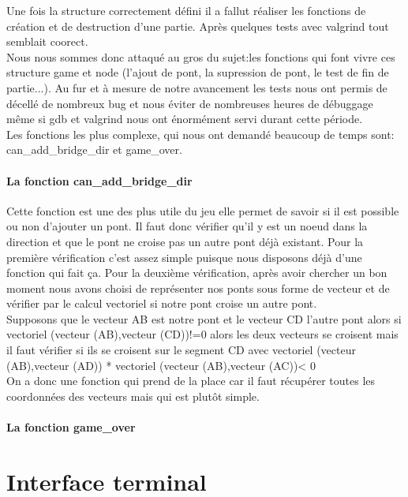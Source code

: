 \documentclass[12pt]{report}
\begin{document}
\textnormal{Une fois la structure correctement défini il a fallut réaliser les fonctions de création et de destruction d'une partie. Après quelques tests avec valgrind tout semblait coorect.\\ Nous nous sommes donc attaqué au gros du sujet:les fonctions qui font vivre ces structure game et node (l'ajout de pont, la supression de pont, le test de fin de partie...). Au fur et à mesure de notre avancement les tests nous ont permis de décellé de nombreux bug et nous éviter de nombreuses heures de débuggage même si gdb et valgrind nous ont énormément servi durant cette période.\\ Les fonctions les plus complexe, qui nous ont demandé beaucoup de temps sont: can\_add\_bridge\_dir et game\_over.}

\subsubsection{La fonction can\_add\_bridge\_dir}
\textnormal{Cette fonction est une des plus utile du jeu elle permet de savoir si il est possible ou non d'ajouter un pont. Il faut donc vérifier qu'il y est un noeud dans la direction et que le pont ne croise pas un autre pont déjà existant. Pour la première vérification c'est assez simple puisque nous disposons déjà d'une fonction qui fait ça. Pour la deuxième vérification, après avoir chercher un bon moment nous avons choisi de représenter nos ponts sous forme de vecteur et de vérifier par le calcul vectoriel si notre pont croise un autre pont. \\ Supposons que le vecteur AB est notre pont et le vecteur CD l'autre pont alors si vectoriel (vecteur (AB),vecteur (CD))!=0 alors les deux vecteurs se croisent mais il faut vérifier si ils se croisent sur le segment CD avec vectoriel (vecteur (AB),vecteur (AD)) * vectoriel (vecteur (AB),vecteur (AC))< 0\\On a donc une fonction qui prend de la place car il faut récupérer toutes les coordonnées des vecteurs mais qui est plutôt simple.}

\subsubsection{La fonction game\_over}

\chapter{Interface terminal}
\end{document}
